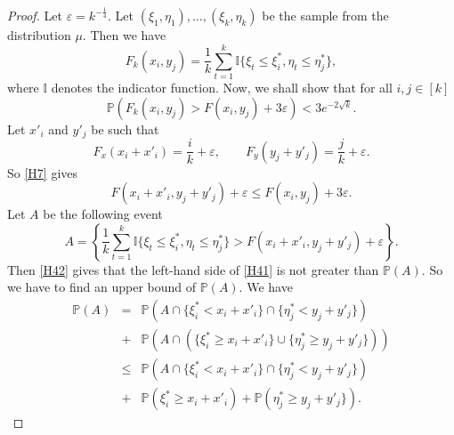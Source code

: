 \documentclass[12pt,twoside]{article}
\theoremstyle{definition}
\theoremstyle{remark}
\numberwithin{equation}{section}
\theoremstyle{plain}
\theoremstyle{remark}
\def\P{{\mathbb {P}}}                       \def\Q{{\mathbb {Q}}}
\def\I{{\mathbb {I}}}                       \def\M{{\mathbb {M}}}
\begin{document}
\begin{proof}
Let $\varepsilon= k^{-\frac{1}{4}}$.
Let $(\xi_1, \eta_1), \dots , (\xi_k, \eta_k)$ be the sample from the distribution $\mu$.
Then we have
\begin{equation} \label{H41-}
F_k(x_i,y_j) = \frac{1}{k} \sum_{t=1}^k \I\{ \xi_t \le \xi_i^\ast, \eta_t \le \eta_j^\ast \} ,
\end{equation} 
where $\I$ denotes the indicator function.
Now, we shall show that for all $i,j\in [k]$
\begin{equation} \label{H41}
\P \left( F_k(x_i,y_j) > F(x_i,y_j) +3\varepsilon   \right)
< 3 e^{-2\sqrt{k}} .
\end{equation} 
Let
$x'_i$ and $y'_j$ be such that
\begin{equation*}
F_x(x_i+ x'_i) = \frac{i}{k }  + \varepsilon, \qquad  F_y(y_j+ y'_j) = \frac{j}{k }  + \varepsilon .
\end{equation*} 
So \eqref{H7} gives
\begin{equation} \label{H42}
F(x_i+ x'_i, y_j+y'_j) +\varepsilon \le F(x_i, y_j) + 3 \varepsilon .
\end{equation} 
Let $A$ be the following event
\begin{equation} \label{H42+}
A=  \left\{\frac{1}{k} \sum_{t=1}^k \I\{ \xi_t \le \xi_i^\ast, \eta_t \le \eta_j^\ast \} 
> F(x_i+ x'_i, y_j+y'_j) +\varepsilon  \right\} .
\end{equation} 
Then \eqref{H42} gives that the left-hand side of \eqref{H41} is not greater than $\P(A)$.
So we have to find an upper bound of $\P(A)$.
We have
\begin{eqnarray} \label{H43}
\P(A) &=& \P\left(A \cap \{ \xi^\ast_i <  x_i+ x'_i  \} \cap \{ \eta^\ast_j <  y_j+ y'_j  \} \right) \\
&+&\P\left(A \cap \left(\{ \xi^\ast_i \ge  x_i+ x'_i  \} 
\cup \{ \eta^\ast_j \ge  y_j+ y'_j  \} \right) \right) \nonumber \\
&\le&
\P\left(A \cap \{ \xi^\ast_i <  x_i+ x'_i  \} \cap \{ \eta^\ast_j <  y_j+ y'_j  \} \right) \nonumber \\
&+&\P\left(\xi^\ast_i \ge  x_i+ x'_i  \right) +
\P\left( \eta^\ast_j \ge  y_j+ y'_j  \} \right) . \nonumber 
\end{eqnarray}


\end{proof}
\end{document}
